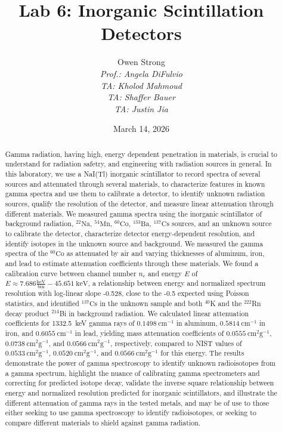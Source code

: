 \documentclass[12pt]{article}
\title{Lab 6: Inorganic Scintillation Detectors}
\author{Owen Strong \\
\itshape Prof.: Angela DiFulvio\\
\itshape TA: Kholod Mahmoud \\
\itshape TA: Shaffer Bauer \\
\itshape TA: Justin Jia \\
}
\date{March 14, 2026}
\newcommand{\CsSrc}{\xspace$\mathrm{^{137}Cs}$\xspace}
\newcommand{\NaSrc}{\xspace$\mathrm{^{22}Na}$\xspace}
\newcommand{\MnSrc}{\xspace$\mathrm{^{54}Mn}$\xspace}
\newcommand{\CoSrc}{\xspace$\mathrm{^{60}Co}$\xspace}
\newcommand{\BaSrc}{\xspace$\mathrm{^{133}Ba}$\xspace}
\begin{document}
\maketitle
\pagebreak
{\hypersetup{linkcolor=black}\tableofcontents}
\pagebreak
{}
\begin{abstract}
    Gamma radiation, having high, energy dependent penetration in materials, is crucial to understand for radiation safetry, and engineering with radiation sources in general.
    In this laboratory, we use a NaI(Tl) inorganic scintillator to record spectra of several sources and attenuated through several materials, to characterize features in known gamma spectra and use them to calibrate a detector, to identify unknown radiation sources, qualify the resolution of the detector, and measure linear attenuation through different materials.
    We measured gamma spectra using the inorganic scintillator of background radiation, \NaSrc, \MnSrc, \CoSrc, \BaSrc, \CsSrc sources, and an unknown source to calibrate the detector, characterize detector energy-dependent resolution, and identify isotopes in the unknown source and background.
    We measured the gamma spectra of the \CoSrc as attenuated by air and varying thicknesses of aluminum, iron, and lead to estimate attenuation coefficients through these materials.
    We found a calibration curve between channel number $n_c$ and energy $E$ of $E\approx 7.686\mathrm{\frac{keV}{bin}} - 45.651~\mathrm{keV}$, a relationship between energy and normalized spectrum resolution with log-linear slope -0.528, close to the -0.5 expected using Poisson statistics, and identified \CsSrc in the unknown sample and both $^{40}$K and the $^{222}$Rn decay product $^{214}$Bi in background radiation.
    We calculated linear attenuation coefficients for 1332.5~keV gamma rays of $0.1498~\mathrm{cm^{-1}}$ in aluminum, $0.5814~\mathrm{cm^{-1}}$ in iron, and $0.6055~\mathrm{cm^{-1}}$ in lead, yielding mass attenuation coefficients of $0.0555~\mathrm{cm^2g^{-1}}$, $0.0738~\mathrm{cm^2g^{-1}}$, and $0.0566~\mathrm{cm^2g^{-1}}$, respectively, compared to NIST values of $0.0533~\mathrm{cm^2g^{-1}}$, $0.0520~\mathrm{cm^2g^{-1}}$, and $0.0566~\mathrm{cm^2g^{-1}}$ for this energy.
    The results demonstrate the power of gamma spectroscopy to identify unknown radioisotopes from a gamma spectrum, highlight the nuance of calibrating gamma spectrometers and correcting for predicted isotope decay, validate the inverse square relationship between energy and normalized resolution predicted for inorganic scintillators, and illustrate the different attenuation of gamma rays in the tested metals, and may be of use to those either seeking to use gamma spectroscopy to identify radioisotopes, or seeking to compare different materials to shield against gamma radiation.
\end{abstract}
\end{document}
